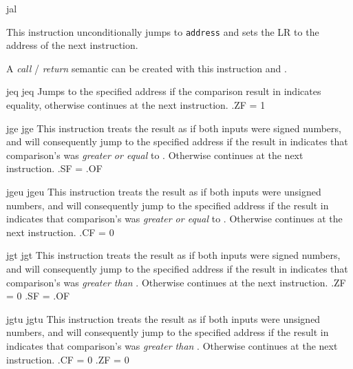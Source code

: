 \begin{instruction}{jal}\label{inst:jal}
     {
       This instruction unconditionally jumps to \texttt{address} and
       sets the \ac{LR} to the address of the next instruction.

       A \emph{call} / \emph{return} semantic can be created with this
       instruction and .
     }
\end{instruction}


\begin{instruction}{jeq}
  \jumptype
     {jeq}
     {\jjeqopc}
     {
       Jumps to the specified address if the comparison result in 
       indicates equality, otherwise continues at the next
       instruction.
     }
     {
       .ZF = 1
     }
\end{instruction}


\begin{instruction}{jge}
  \jumptype
     {jge}
     {\jjgeopc}
     {This instruction treats the  result as if both
       inputs were signed numbers, and will consequently jump to the
       specified address if the result in  indicates that
       comparison's  was \emph{greater or equal} to .
       Otherwise continues at the next instruction.}
     {.SF = .OF}
\end{instruction}

\begin{instruction}{jgeu}
  \jumptype
     {jgeu}
     {\jjgeuopc}
     {This instruction treats the  result as if both
       inputs were unsigned numbers, and will consequently jump to the
       specified address if the result in  indicates that
       comparison's  was \emph{greater or equal} to .
       Otherwise continues at the next instruction.}
     {.CF = 0}
\end{instruction}

\begin{instruction}{jgt}
  \jumptype
     {jgt}
     {\jjgtopc}
     {This instruction treats the  result as if both
       inputs were signed numbers, and will consequently jump to the
       specified address if the result in  indicates that
       comparison's  was \emph{greater than} .
       Otherwise continues at the next instruction.}
     {.ZF = 0 \wedge {}.SF = .OF}
\end{instruction}

\begin{instruction}{jgtu}
  \jumptype
     {jgtu}
     {\jjgtuopc}
     {This instruction treats the  result as if both
       inputs were unsigned numbers, and will consequently jump to the
       specified address if the result in  indicates that
       comparison's  was \emph{greater than} .
       Otherwise continues at the next instruction.}
     {.CF = 0 \wedge {}.ZF = 0}
\end{instruction}

